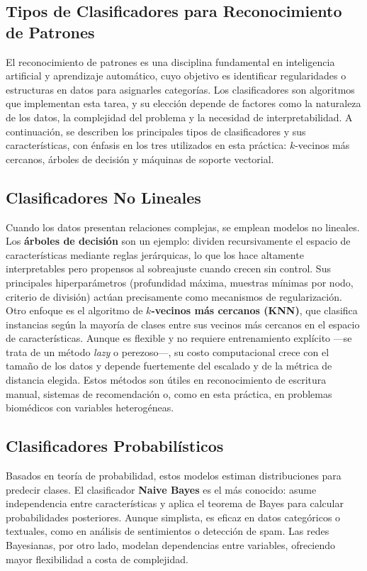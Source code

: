 \subsection{Tipos de Clasificadores para Reconocimiento de Patrones}

El reconocimiento de patrones es una disciplina fundamental en inteligencia
artificial y aprendizaje automático, cuyo objetivo es identificar
regularidades o estructuras en datos para asignarles categorías. Los
clasificadores son algoritmos que implementan esta tarea, y su elección
depende de factores como la naturaleza de los datos, la complejidad del
problema y la necesidad de interpretabilidad. A continuación, se describen
los principales tipos de clasificadores y sus características, con énfasis
en los tres utilizados en esta práctica: $k$-vecinos más cercanos, árboles
de decisión y máquinas de soporte vectorial.

\subsection{Clasificadores No Lineales}

Cuando los datos presentan relaciones complejas, se emplean modelos no
lineales. Los \textbf{árboles de decisión} son un ejemplo: dividen
recursivamente el espacio de características mediante reglas jerárquicas, lo
que los hace altamente interpretables pero propensos al sobreajuste cuando
crecen sin control. Sus principales hiperparámetros (profundidad máxima,
muestras mínimas por nodo, criterio de división) actúan precisamente como
mecanismos de regularización. Otro enfoque es el algoritmo de
\textbf{$k$-vecinos más cercanos (KNN)}, que clasifica instancias según la
mayoría de clases entre sus vecinos más cercanos en el espacio de
características. Aunque es flexible y no requiere entrenamiento explícito
---se trata de un método \textit{lazy} o perezoso---, su costo
computacional crece con el tamaño de los datos y depende fuertemente del
escalado y de la métrica de distancia elegida. Estos métodos son útiles en
reconocimiento de escritura manual, sistemas de recomendación o, como en
esta práctica, en problemas biomédicos con variables heterogéneas.

\subsection{Clasificadores Probabilísticos}

Basados en teoría de probabilidad, estos modelos estiman distribuciones
para predecir clases. El clasificador \textbf{Naive Bayes} es el más
conocido: asume independencia entre características y aplica el teorema de
Bayes para calcular probabilidades posteriores. Aunque simplista, es eficaz
en datos categóricos o textuales, como en análisis de sentimientos o
detección de spam. Las redes Bayesianas, por otro lado, modelan dependencias
entre variables, ofreciendo mayor flexibilidad a costa de complejidad.

